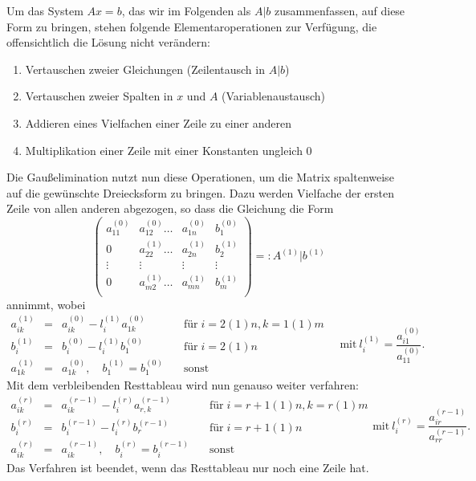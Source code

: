 Um das System $Ax=b$, das wir im Folgenden als $A|b$ zusammenfassen,
auf diese Form zu bringen, stehen folgende Elementaroperationen zur
Verfügung, die offensichtlich die Lösung nicht verändern:
\begin{enumerate}[beginpenalty=10000]
\item Vertauschen zweier Gleichungen (Zeilentausch in $A|b$)
\item Vertauschen zweier Spalten in $x$ und $A$ (Variablenaustausch)
\item Addieren eines Vielfachen einer Zeile zu einer anderen
\item Multiplikation einer Zeile mit einer Konstanten ungleich 0
\end{enumerate}
Die Gaußelimination nutzt nun diese Operationen, um die Matrix
spaltenweise auf die gewünschte Dreiecksform zu bringen. Dazu werden
Vielfache der ersten Zeile von allen anderen abgezogen, so dass die
Gleichung die Form
\begin{equation}
  \left(\begin{array}{lll|c}
      a_{11}^{(0)} & a_{12}^{(0)}\ldots &a_{1n}^{(0)} & b_1^{(0)}\\
      0     & a_{22}^{(1)}\ldots &a_{2n}^{(1)} & b_2^{(1)}\\
      \vdots& \vdots      &\vdots& \vdots\\
      0     & a_{m2}^{(1)}\ldots &a_{mn}^{(1)} & b_m^{(1)}\\
    \end{array}\right) =: A^{(1)} | b^{(1)}
\end{equation}
annimmt, wobei
\begin{equation}
  \begin{array}{rcll}
    a_{ik}^{(1)} &=& a_{ik}^{(0)} -  l_{i}^{(1)}a_{1k}^{(0)}
    & \quad\text{für}\; i=2(1)n, k=1(1)m\\[0.3em]
    b_{i}^{(1)} &=& b_{i}^{(0)} - l_{i}^{(1)} b_{1}^{(0)}
    & \quad\text{für}\; i=2(1)n \\[0.3em]
    a_{1k}^{(1)} &=& a_{1k}^{(0)},\quad b_{1}^{(1)} = b_{1}^{(0)}
    & \quad\text{sonst}
  \end{array}
  \quad\text{mit}~ l_{i}^{(1)} = \frac{a_{i1}^{(0)}}{a_{11}^{(0)}}.
\end{equation}
Mit dem verbleibenden Resttableau wird nun
genauso weiter verfahren:
\begin{equation}
  \label{eq:gausseli}
  \begin{array}{rcll}
    a_{ik}^{(r)} &=& a_{ik}^{(r-1)} -  l_{i}^{(r)}a_{r,k}^{(r-1)}
    & \quad\text{für}\; i=r+1(1)n, k=r(1)m\\[0.3em]
    b_{i}^{(r)} &=& b_{i}^{(r-1)} - l_{i}^{(r)} b_{r}^{(r-1)}
    & \quad\text{für}\; i=r+1(1)n \\[0.3em]
    a_{ik}^{(r)} &=& a_{ik}^{(r-1)},\quad b_{i}^{(r)} = b_{i}^{(r-1)}
    & \quad\text{sonst}
  \end{array}
  \text{mit}~ l_{i}^{(r)} = \frac{a_{ir}^{(r-1)}}{a_{rr}^{(r-1)}}.
\end{equation}
Das Verfahren ist beendet, wenn das Resttableau nur noch eine Zeile hat.

